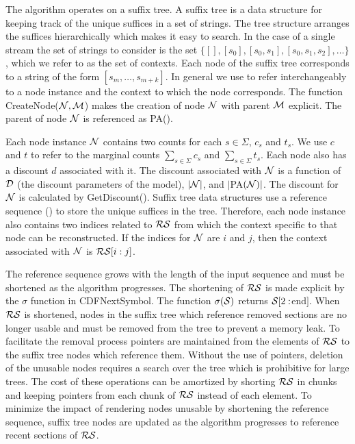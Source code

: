 The algorithm operates on a suffix tree.  A suffix tree is a data structure for keeping track of the unique suffices in a set of strings.  The tree structure arranges the suffices hierarchically which makes it easy to search.  In the case of a single stream the set of strings to consider is the set $\{ [ ], [s_0], [s_0,s_1], [s_0, s_1,s_2], \ldots \}$, which we refer to as the set of contexts.   Each node of the suffix tree corresponds to a string of the form $[s_m, \ldots, s_{m + k}]$.  In general we use \N \space to refer interchangeably to a node instance and the context to which the node corresponds. The function CreateNode($\N, \M$) makes the creation of node $\N$ with parent $\M$ explicit. The parent of node $\N$ is referenced as PA(\N).

Each node instance $\N$ contains two counts for each $s \in \Sigma$, $c_s$ and $t_s$.  We use $c$ and $t$ to refer to the marginal counts $\sum_{s \in \Sigma} c_s$ and $\sum_{s \in \Sigma} t_s$.  Each node also has a discount $d$ associated with it.  The discount associated with $\N$ is a function of $\D$ (the discount parameters of the model), $|\N|$, and $|$PA$(\N)|$.  The discount for $\N$ is calculated by GetDiscount(\N). Suffix tree data structures use a reference sequence (\RS) to store the unique suffices in the tree.  Therefore, each node instance also contains two indices related to $\RS$ from which the context specific to that node can be reconstructed.  If the indices for $\N$ are $i$ and $j$, then the context associated with $\N$ is $\RS[i : j]$.

The reference sequence grows with the length of the input sequence and must be shortened as the algorithm progresses.  The shortening of $\RS$ is made explicit by the $\sigma$ function in CDFNextSymbol.  The function $\sigma(\Seq)$ returns $\Seq[2:$end$]$.  When $\RS$ is shortened, nodes in the suffix tree which reference removed sections are no longer usable and must be removed from the tree to prevent a memory leak.  To facilitate the removal process pointers are maintained from the elements of $\RS$ to the suffix tree nodes which reference them.  Without the use of pointers, deletion of the unusable nodes requires a search over the tree which is prohibitive for large trees. The cost of these operations can be amortized by shorting $\RS$ in chunks and keeping pointers from each chunk of $\RS$ instead of each element.  To minimize the impact of rendering nodes unusable by shortening the reference sequence, suffix tree nodes are updated as the algorithm progresses to reference recent sections of $\RS$.


